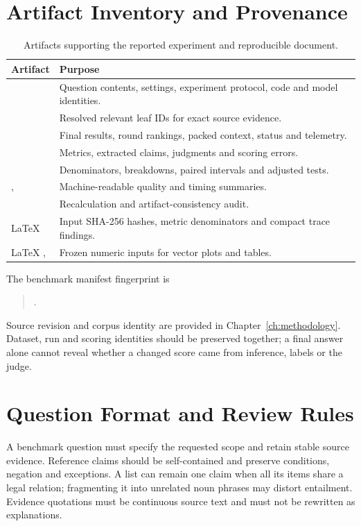\documentclass[11pt,a4paper,oneside]{report}
\begin{document}
\section{Artifact Inventory and Provenance}
\begin{table}[H]\centering\small
\caption{Artifacts supporting the reported experiment and reproducible document.}\label{tab:artifacts}
\begin{tabularx}{\textwidth}{P{4.2cm}Y}\toprule
\textbf{Artifact} & \textbf{Purpose}\\\midrule
{} & Question contents, settings, experiment protocol, code and model identities.\\
 & Resolved relevant leaf IDs for exact source evidence.\\
 & Final results, round rankings, packed context, status and telemetry.\\
 & Metrics, extracted claims, judgments and scoring errors.\\
 & Denominators, breakdowns, paired intervals and adjusted tests.\\
,  & Machine-readable quality and timing summaries.\\
 & Recalculation and artifact-consistency audit.\\
LaTeX  & Input SHA-256 hashes, metric denominators and compact trace findings.\\
LaTeX ,  & Frozen numeric inputs for vector plots and tables.\\\bottomrule
\end{tabularx}
\end{table}
The benchmark manifest fingerprint is
\begin{quote}\footnotesize{}.\end{quote}
Source revision and corpus identity are provided in Chapter~\ref{ch:methodology}. Dataset, run and scoring identities should be preserved together; a final answer alone cannot reveal whether a changed score came from inference, labels or the judge.

\section{Question Format and Review Rules}
A benchmark question must specify the requested scope and retain stable source evidence. Reference claims should be self-contained and preserve conditions, negation and exceptions. A list can remain one claim when all its items share a legal relation; fragmenting it into unrelated noun phrases may distort entailment. Evidence quotations must be continuous source text and must not be rewritten as explanations.
\end{document}
